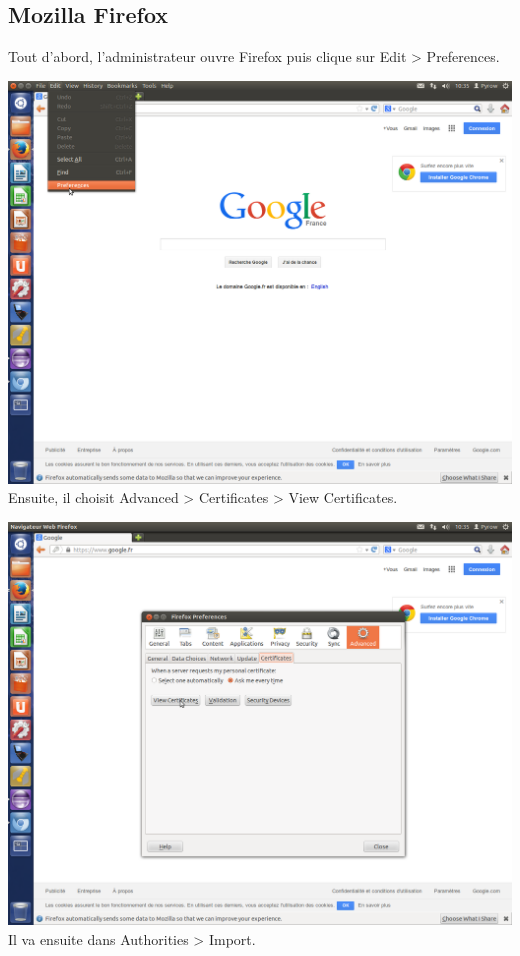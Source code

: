 \subsection{Mozilla Firefox}

Tout d'abord, l'administrateur ouvre Firefox puis clique sur Edit > Preferences.

\includegraphics[width=\textwidth]{images_autorites/OngletPref.png}
\newpage
Ensuite, il choisit Advanced > Certificates > View Certificates.

\includegraphics[width=\textwidth]{images_autorites/OngletCert.png}
\newpage
Il va ensuite dans Authorities > Import.

